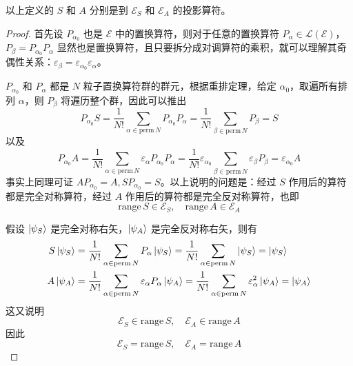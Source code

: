 \documentclass[cn,10pt,math=newtx,citestyle=gb7714-2015,bibstyle=gb7714-2015]{elegantbook}
\def\ms{\mathscr}
\def\mc{\mathcal}
\def\ve{\varepsilon}
\begin{document}
\begin{theorem}[对称化算符与反对称化算符的作用]\label{thm:symmtrztn_oprtr}
    以上定义的 $S$ 和 $A$ 分别是到 $\ms E_S$ 和 $\ms E_A$ 的投影算符。
\end{theorem}
\begin{proof}
    首先设 $P_{\alpha_0}$ 也是 $\ms E$ 中的置换算符，则对于任意的置换算符 $P_\alpha\in\mc L(\ms E)$，$P_\beta = P_{\alpha_0}P_{\alpha}$ 显然也是置换算符，且只要拆分成对调算符的乘积，就可以理解其奇偶性关系：$\ve_\beta = \ve_{\alpha_0}\ve_\alpha$。
    
    $P_{\alpha_0}$ 和 $P_\alpha$ 都是 $N$ 粒子置换算符群的群元，根据重排定理，给定 $\alpha_0$，取遍所有排列 $\alpha$，则 $P_\beta$ 将遍历整个群，因此可以推出
    \begin{equation}
        P_{\alpha_0}S = \frac 1{N!}\sum_{\alpha\in\text{perm}\,N}P_{\alpha_0}P_\alpha = \frac 1{N!}\sum_{\beta\in\text{perm}\,N}P_\beta = S
    \end{equation}
    以及
    \begin{equation}
        P_{\alpha_0}A = \frac 1{N!}\sum_{\alpha\in\text{perm}\,N}\ve_{\alpha}P_{\alpha_0}P_\alpha = \frac 1{N!}\ve_{\alpha_0}\sum_{\beta\in\text{perm}\,N}\ve_{\beta}P_\beta = \ve_{\alpha_0}A
    \end{equation}
    事实上同理可证 $AP_{\alpha_0}=A,SP_{\alpha_0}=S$。以上说明的问题是：经过 $S$ 作用后的算符都是完全对称算符，经过 $A$ 作用后的算符都是完全反对称算符，也即
    \begin{equation}
        \text{range}\,S\in\ms E_S,\quad\text{range}\,A\in\ms E_A
    \end{equation}
    
    假设 $\ket{\psi_S}$ 是完全对称右矢，$\ket{\psi_A}$ 是完全反对称右矢，则有
    \begin{align}
        S\ket{\psi_S} &= \frac 1{N!}\sum_{\alpha\in\text{perm}\,N}P_\alpha\ket{\psi_S} = \frac 1{N!}\sum_{\alpha\in\text{perm}\,N}\ket{\psi_S} = \ket{\psi_S}\\
        A\ket{\psi_A} &= \frac 1{N!}\sum_{\alpha\in\text{perm}\,N}\ve_\alpha P_\alpha\ket{\psi_A} = \frac 1{N!}\sum_{\alpha\in\text{perm}\,N}\ve_\alpha^2\ket{\psi_A} = \ket{\psi_A}\\
    \end{align}
    这又说明
    \begin{equation}
        \ms E_S\in \text{range}\,S,\quad\ms E_A\in\text{range}\,A
    \end{equation}
    因此
    \begin{equation}
        \ms E_S= \text{range}\,S,\quad\ms E_A=\text{range}\,A
    \end{equation}
    

\end{proof}
\end{document}
